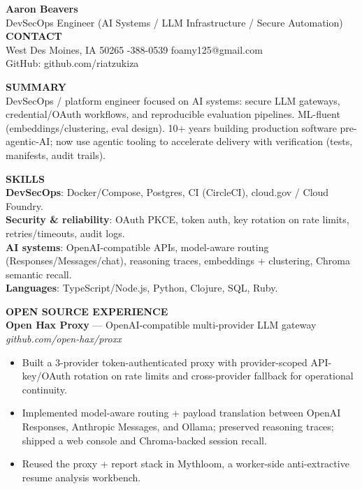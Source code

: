\documentclass[10pt]{article}
\begin{document}
{\LARGE \textbf{Aaron Beavers}}\\
DevSecOps Engineer (AI Systems / LLM Infrastructure / Secure Automation)\\

\vspace{2pt}
\textbf{CONTACT}\\
West Des Moines, IA 50265 \;\;\textbar\;-388-0539 \;\;\textbar\;\; foamy125@gmail.com\\
GitHub: github.com/riatzukiza

\vspace{4pt}
\textbf{SUMMARY}\\
DevSecOps / platform engineer focused on AI systems: secure LLM gateways, credential/OAuth workflows, and reproducible evaluation pipelines. ML-fluent (embeddings/clustering, eval design). 10+ years building production software pre-agentic-AI; now use agentic tooling to accelerate delivery with verification (tests, manifests, audit trails).

\vspace{2pt}
\textbf{SKILLS}\\
\textbf{DevSecOps}: Docker/Compose, Postgres, CI (CircleCI), cloud.gov / Cloud Foundry.\\
\textbf{Security \& reliability}: OAuth PKCE, token auth, key rotation on rate limits, retries/timeouts, audit logs.\\
\textbf{AI systems}: OpenAI-compatible APIs, model-aware routing (Responses/Messages/chat), reasoning traces, embeddings + clustering, Chroma semantic recall.\\
\textbf{Languages}: TypeScript/Node.js, Python, Clojure, SQL, Ruby.

\vspace{4pt}
\textbf{OPEN SOURCE EXPERIENCE}\\

\textbf{Open Hax Proxy} --- OpenAI-compatible multi-provider LLM gateway \hfill \textit{github.com/open-hax/proxx}\\
\vspace{-6pt}
\begin{itemize}
  \setlength\itemsep{-2pt}
  \setlength\parskip{0pt}
  \setlength\parsep{0pt}
  \item Built a 3-provider token-authenticated proxy with provider-scoped API-key/OAuth rotation on rate limits and cross-provider fallback for operational continuity.
  \item Implemented model-aware routing + payload translation between OpenAI Responses, Anthropic Messages, and Ollama; preserved reasoning traces; shipped a web console and Chroma-backed session recall.
  \item Reused the proxy + report stack in Mythloom, a worker-side anti-extractive resume analysis workbench.
\end{itemize}
\end{document}
